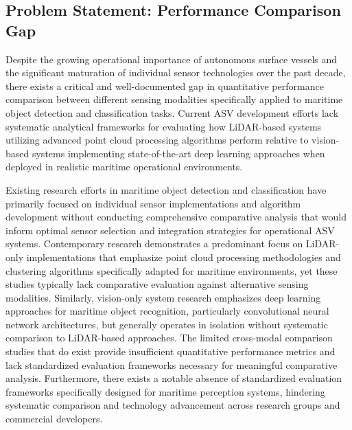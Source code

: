 \documentclass{erauthesis}
\begin{document}
\subsection{Problem Statement: Performance Comparison Gap}

Despite the growing operational importance of autonomous surface vessels and the significant maturation of individual sensor technologies over the past decade, there exists a critical and well-documented gap in quantitative performance comparison between different sensing modalities specifically applied to maritime object detection and classification tasks. Current ASV development efforts lack systematic analytical frameworks for evaluating how LiDAR-based systems utilizing advanced point cloud processing algorithms perform relative to vision-based systems implementing state-of-the-art deep learning approaches when deployed in realistic maritime operational environments.

Existing research efforts in maritime object detection and classification have primarily focused on individual sensor implementations and algorithm development without conducting comprehensive comparative analysis that would inform optimal sensor selection and integration strategies for operational ASV systems. Contemporary research demonstrates a predominant focus on LiDAR-only implementations that emphasize point cloud processing methodologies and clustering algorithms specifically adapted for maritime environments, yet these studies typically lack comparative evaluation against alternative sensing modalities. Similarly, vision-only system research emphasizes deep learning approaches for maritime object recognition, particularly convolutional neural network architectures, but generally operates in isolation without systematic comparison to LiDAR-based approaches. The limited cross-modal comparison studies that do exist provide insufficient quantitative performance metrics and lack standardized evaluation frameworks necessary for meaningful comparative analysis. Furthermore, there exists a notable absence of standardized evaluation frameworks specifically designed for maritime perception systems, hindering systematic comparison and technology advancement across research groups and commercial developers.
\end{document}
